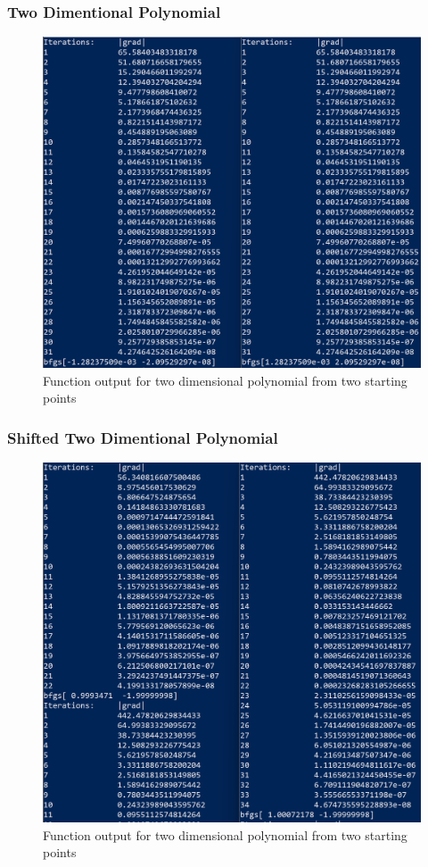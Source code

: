 \documentclass[11pt]{article}%
\begin{document}
\subsubsection{Two Dimentional Polynomial}
\label{sec:twodpoly}
\begin{figure}[!ht]
    \centering
   \includegraphics[width=0.75\linewidth]{d2.png}
    \caption{Function output for two dimensional polynomial from two starting points}
    \label{fig:d2}
\end{figure}
\newpage
\subsubsection{Shifted Two Dimentional Polynomial}
\label{sec:twodpolyshift}
\begin{figure}[!ht]
    \centering
   \includegraphics[width=0.75\linewidth]{d2shifted.png}
    \caption{Function output for two dimensional polynomial from two starting points}
    \label{fig:d2shifted}
\end{figure}
\newpage
\end{document}
